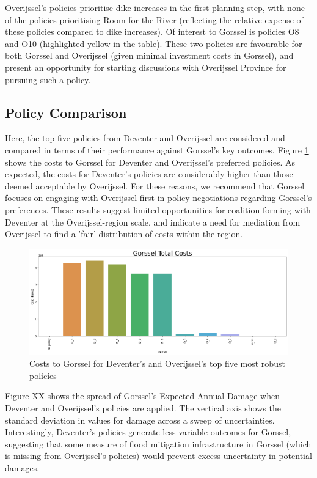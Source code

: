 \noindent Overijssel's policies prioritise dike increases in the first planning step, with none of the policies prioritising Room for the River (reflecting the relative expense of these policies compared to dike increases). Of interest to Gorssel is policies O8 and O10 (highlighted yellow in the table). These two policies are favourable for both Gorssel and Overijssel (given minimal investment costs in Gorssel), and present an opportunity for starting discussions with Overijssel Province for pursuing such a policy.

\subsection{Policy Comparison}
Here, the top five policies from Deventer and Overijssel are considered and compared in terms of their performance against Gorssel's key outcomes. Figure \ref{fig:cost-pol-g} shows the costs to Gorssel for Deventer and Overijssel's preferred policies. As expected, the costs for Deventer's policies are considerably higher than those deemed acceptable by Overijssel. For these reasons, we recommend that Gorssel focuses on engaging with Overijssel first in policy negotiations regarding Gorssel's preferences. These results suggest limited opportunities for coalition-forming with Deventer at the Overijssel-region scale, and indicate a need for mediation from Overijssel to find a 'fair' distribution of costs within the region.

\begin{figure}[h!]
    \centering
    \includegraphics[width=\textwidth]{report/figures/results/spreads/cost_policies_Gorssel.png}
    \caption{Costs to Gorssel for Deventer's and Overijssel's top five most robust policies}
    \label{fig:cost-pol-g}
\end{figure}

Figure XX shows the spread of Gorssel's Expected Annual Damage when Deventer and Overijssel's policies are applied. The vertical axis shows the standard deviation in values for damage across a sweep of uncertainties. Interestingly, Deventer's policies generate less variable outcomes for Gorssel, suggesting that some measure of flood mitigation infrastructure in Gorssel (which is missing from Overijssel's policies) would prevent excess uncertainty in potential damages.



